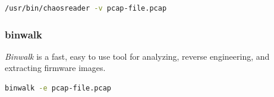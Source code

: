 \begin{lstlisting}[language=bash]
    /usr/bin/chaosreader -v pcap-file.pcap
\end{lstlisting}

\subsubsection{binwalk}
\textit{Binwalk} is a fast, easy to use tool for analyzing, reverse engineering, and extracting firmware images.

\begin{lstlisting}[language=bash]
    binwalk -e pcap-file.pcap
\end{lstlisting}

